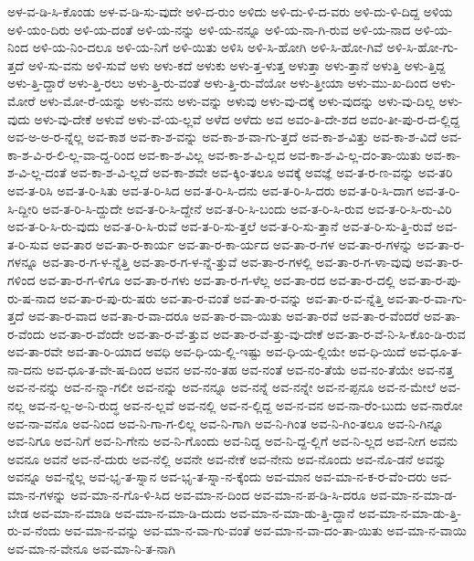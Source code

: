 {ಅಳ-ವ-ಡಿ-ಸಿ-ಕೊಂಡು
ಅಳ-ವ-ಡಿ-ಸು-ವುದೇ
ಅಳಿ-ದ-ರುಂ
ಅಳಿದು
ಅಳಿ-ದು-ಳಿ-ದ-ವರು
ಅಳಿ-ದು-ಳಿ-ದಿದ್ದ
ಅಳಿಯ
ಅಳಿ-ಯಂ-ದಿರು
ಅಳಿ-ಯ-ದಂತೆ
ಅಳಿ-ಯ-ನನ್ನು
ಅಳಿ-ಯ-ನನ್ನೂ
ಅಳಿ-ಯ-ನಾ-ಗಿ-ರುವ
ಅಳಿ-ಯ-ನಾದ
ಅಳಿ-ಯ-ನಿಂದ
ಅಳಿ-ಯ-ನಿಂ-ದಲೂ
ಅಳಿ-ಯ-ನಿಗೆ
ಅಳಿ-ಯಿತು
ಅಳಿಸಿ
ಅಳಿ-ಸಿ-ಹೋಗಿ
ಅಳಿ-ಸಿ-ಹೋ-ಗಿವೆ
ಅಳಿ-ಸಿ-ಹೋ-ಗು-ತ್ತದೆ
ಅಳಿ-ಸು-ವನು
ಅಳಿ-ಸುವೆ
ಅಳು
ಅಳು-ಕದೆ
ಅಳುಕು
ಅಳು-ತ್ತ-ಳುತ್ತ
ಅಳುತ್ತಾ
ಅಳು-ತ್ತಾನೆ
ಅಳುತ್ತಿ
ಅಳು-ತ್ತಿದ್ದ
ಅಳು-ತ್ತಿ-ದ್ದಾರೆ
ಅಳು-ತ್ತಿ-ರಲು
ಅಳು-ತ್ತಿ-ರು-ವಂತೆ
ಅಳು-ತ್ತಿ-ರು-ವೆಯೋ
ಅಳು-ತ್ತೀಯಾ
ಅಳು-ಮು-ಖ-ದಿಂದ
ಅಳು-ಮೋರೆ
ಅಳು-ಮೋ-ರೆ-ಯನ್ನು
ಅಳು-ವನು
ಅಳು-ವನ್ನು
ಅಳುವು
ಅಳು-ವು-ದಕ್ಕೆ
ಅಳು-ವುದನ್ನು
ಅಳು-ವು-ದಿಲ್ಲ
ಅಳು-ವುದು
ಅಳು-ವು-ದೇಕೆ
ಅಳುವೆ
ಅಳು-ವೆ-ಯ-ಲ್ಲವೆ
ಅಳೆದ
ಅಳೆದು
ಅವ
ಅವಂ-ತಿ-ದೇ-ಶದ
ಅವಂ-ತೀ-ಪು-ರ-ದ-ಲ್ಲಿದ್ದ
ಅವ-ಅ-ಅ-ರ-ನ್ನೆಲ್ಲ
ಅವ-ಕಾಶ
ಅವ-ಕಾ-ಶ-ವನ್ನು
ಅವ-ಕಾ-ಶ-ವಾ-ಗು-ತ್ತದೆ
ಅವ-ಕಾ-ಶ-ವಿತ್ತು
ಅವ-ಕಾ-ಶ-ವಿದೆ
ಅವ-ಕಾ-ಶ-ವಿ-ರ-ಲಿ-ಲ್ಲ-ವಾ-ದ್ದ-ರಿಂದ
ಅವ-ಕಾ-ಶ-ವಿಲ್ಲ
ಅವ-ಕಾ-ಶ-ವಿ-ಲ್ಲದ
ಅವ-ಕಾ-ಶ-ವಿ-ಲ್ಲ-ದಂ-ತಾ-ಯಿತು
ಅವ-ಕಾ-ಶ-ವಿ-ಲ್ಲ-ದಂತೆ
ಅವ-ಕಾ-ಶ-ವಿ-ಲ್ಲದೆ
ಅವ-ಕಾ-ಶವೇ
ಅವ-ಕ್ಕಿಂ-ತಲೂ
ಅವಕ್ಕೆ
ಅವಜ್ಞೆ
ಅವ-ತ-ರ-ಣ-ವನ್ನು
ಅವ-ತರಿ
ಅವ-ತ-ರಿಸಿ
ಅವ-ತ-ರಿ-ಸಿತು
ಅವ-ತ-ರಿ-ಸಿದ
ಅವ-ತ-ರಿ-ಸಿ-ದನು
ಅವ-ತ-ರಿ-ಸಿ-ದರು
ಅವ-ತ-ರಿ-ಸಿ-ದಾಗ
ಅವ-ತ-ರಿ-ಸಿ-ದ್ದೀರಿ
ಅವ-ತ-ರಿ-ಸಿ-ದ್ದುದೇ
ಅವ-ತ-ರಿ-ಸಿ-ದ್ದೇನೆ
ಅವ-ತ-ರಿ-ಸಿ-ಬಂದು
ಅವ-ತ-ರಿ-ಸಿ-ರುವ
ಅವ-ತ-ರಿ-ಸಿ-ರು-ವಿರಿ
ಅವ-ತ-ರಿ-ಸಿ-ರು-ವುದು
ಅವ-ತ-ರಿ-ಸಿ-ರುವೆ
ಅವ-ತ-ರಿ-ಸು-ತ್ತಲೆ
ಅವ-ತ-ರಿ-ಸು-ತ್ತಾನೆ
ಅವ-ತ-ರಿ-ಸು-ತ್ತಿ-ರುವೆ
ಅವ-ತ-ರಿ-ಸುವ
ಅವ-ತಾರ
ಅವ-ತಾ-ರ-ಕಾರ್ಯ
ಅವ-ತಾ-ರ-ಕಾ-ರ್ಯದ
ಅವ-ತಾ-ರ-ಗಳ
ಅವ-ತಾ-ರ-ಗಳನ್ನು
ಅವ-ತಾ-ರ-ಗಳನ್ನೂ
ಅವ-ತಾ-ರ-ಗ-ಳ-ನ್ನೆತ್ತಿ
ಅವ-ತಾ-ರ-ಗ-ಳ-ನ್ನೆ-ತ್ತುವೆ
ಅವ-ತಾ-ರ-ಗಳಲ್ಲಿ
ಅವ-ತಾ-ರ-ಗ-ಳಾ-ವುವು
ಅವ-ತಾ-ರ-ಗಳಿಂದ
ಅವ-ತಾ-ರ-ಗ-ಳಿಗೂ
ಅವ-ತಾ-ರ-ಗಳು
ಅವ-ತಾ-ರ-ಗ-ಳೆಲ್ಲ
ಅವ-ತಾ-ರದ
ಅವ-ತಾ-ರ-ದಲ್ಲಿ
ಅವ-ತಾ-ರ-ಪು-ರು-ಷ-ನಾದ
ಅವ-ತಾ-ರ-ಪು-ರು-ಷರು
ಅವ-ತಾ-ರ-ವಂತೆ
ಅವ-ತಾ-ರ-ವನ್ನು
ಅವ-ತಾ-ರ-ವ-ನ್ನೆತ್ತಿ
ಅವ-ತಾ-ರ-ವಾ-ಗು-ತ್ತದೆ
ಅವ-ತಾ-ರ-ವಾದ
ಅವ-ತಾ-ರ-ವಾ-ದರೂ
ಅವ-ತಾ-ರ-ವಾ-ಯಿತು
ಅವ-ತಾ-ರವೆ
ಅವ-ತಾ-ರ-ವೆಂದರೆ
ಅವ-ತಾ-ರ-ವೆಂದು
ಅವ-ತಾ-ರ-ವೆಂದೇ
ಅವ-ತಾ-ರ-ವೆ-ತ್ತುವ
ಅವ-ತಾ-ರ-ವೆ-ತ್ತು-ವು-ದೇಕೆ
ಅವ-ತಾ-ರ-ವೆ-ನಿ-ಸಿ-ಕೊಂ-ಡಿ-ರುವ
ಅವ-ತಾ-ರವೇ
ಅವ-ತಾ-ರಿ-ಯಾದ
ಅವಧಿ
ಅವ-ಧಿ-ಯ-ಲ್ಲಿ-ಇಷ್ಟು
ಅವ-ಧಿ-ಯ-ಲ್ಲಿಯೇ
ಅವ-ಧಿ-ಯಿದೆ
ಅವ-ಧೂ-ತ-ನಾ-ದನು
ಅವ-ಧೂ-ತ-ವೇ-ಷ-ದಿಂದ
ಅವನ
ಅವ-ನಂ-ತಹ
ಅವ-ನಂತೆ
ಅವ-ನಂ-ತೆಯೆ
ಅವ-ನಂ-ತೆಯೇ
ಅವ-ನತ್ತ
ಅವ-ನ-ನನ್ನು
ಅವ-ನ-ನ್ನಾ-ಗಲೀ
ಅವ-ನನ್ನು
ಅವ-ನನ್ನೂ
ಅವ-ನನ್ನೆ
ಅವ-ನನ್ನೇ
ಅವ-ನ-ಪ್ಪನೂ
ಅವ-ನ-ಮೇಲೆ
ಅವ-ನಲ್ಲ
ಅವ-ನ-ಲ್ಲ-ಅ-ನಿ-ರುದ್ಧ
ಅವ-ನ-ಲ್ಲವೆ
ಅವ-ನಲ್ಲಿ
ಅವ-ನ-ಲ್ಲಿದ್ದ
ಅವ-ನ-ವನ
ಅವ-ನಾ-ರೆಂ-ಬುದು
ಅವ-ನಾರೋ
ಅವ-ನಾ-ವನೊ
ಅವ-ನಿಂದ
ಅವ-ನಿ-ಗಾ-ಗ-ಲಿಲ್ಲ
ಅವ-ನಿ-ಗಾಗಿ
ಅವ-ನಿ-ಗಿಂತ
ಅವ-ನಿ-ಗಿಂ-ತಲೂ
ಅವ-ನಿ-ಗಿನ್ನೂ
ಅವ-ನಿಗೂ
ಅವ-ನಿಗೆ
ಅವ-ನಿ-ಗೇನು
ಅವ-ನಿ-ಗೊಂದು
ಅವ-ನಿದ್ದ
ಅವ-ನಿ-ದ್ದ-ಲ್ಲಿಗೆ
ಅವ-ನಿ-ಲ್ಲದ
ಅವ-ನೀಗ
ಅವನು
ಅವನೂ
ಅವನೆ
ಅವ-ನೆ-ದುರು
ಅವ-ನೆಲ್ಲಿ
ಅವನೇ
ಅವ-ನೇಕೆ
ಅವ-ನೇನು
ಅವ-ನೊಂದು
ಅವ-ನೊ-ಡನೆ
ಅವನ್ನು
ಅವನ್ನೂ
ಅವ-ನ್ನೆಲ್ಲ
ಅವ-ಭೃ-ತ-ಸ್ನಾನ
ಅವ-ಭೃ-ತ-ಸ್ನಾ-ನ-ಕ್ಕೆಂದು
ಅವ-ಮಾನ
ಅವ-ಮಾ-ನ-ಕ-ರ-ವೆಂ-ದರು
ಅವ-ಮಾ-ನ-ಗಳನ್ನು
ಅವ-ಮಾ-ನ-ಗೊ-ಳಿ-ಸಿದ
ಅವ-ಮಾ-ನ-ದಿಂದ
ಅವ-ಮಾ-ನ-ಪ-ಡಿ-ಸಿ-ದರೂ
ಅವ-ಮಾ-ನ-ಮಾ-ಡ-ಬೇಡ
ಅವ-ಮಾ-ನ-ಮಾಡಿ
ಅವ-ಮಾ-ನ-ಮಾ-ಡಿ-ದುದು
ಅವ-ಮಾ-ನ-ಮಾ-ಡು-ತ್ತಿ-ದ್ದಾನೆ
ಅವ-ಮಾ-ನ-ಮಾ-ಡು-ತ್ತಿ-ರು-ವ-ನೆಂದು
ಅವ-ಮಾ-ನ-ವನ್ನು
ಅವ-ಮಾ-ನ-ವಾ-ಗು-ವಂತೆ
ಅವ-ಮಾ-ನ-ವಾ-ದಂ-ತಾ-ಯಿತು
ಅವ-ಮಾ-ನ-ವಾಯಿ
ಅವ-ಮಾ-ನ-ವೇನೂ
ಅವ-ಮಾ-ನಿ-ತ-ನಾಗಿ
}
